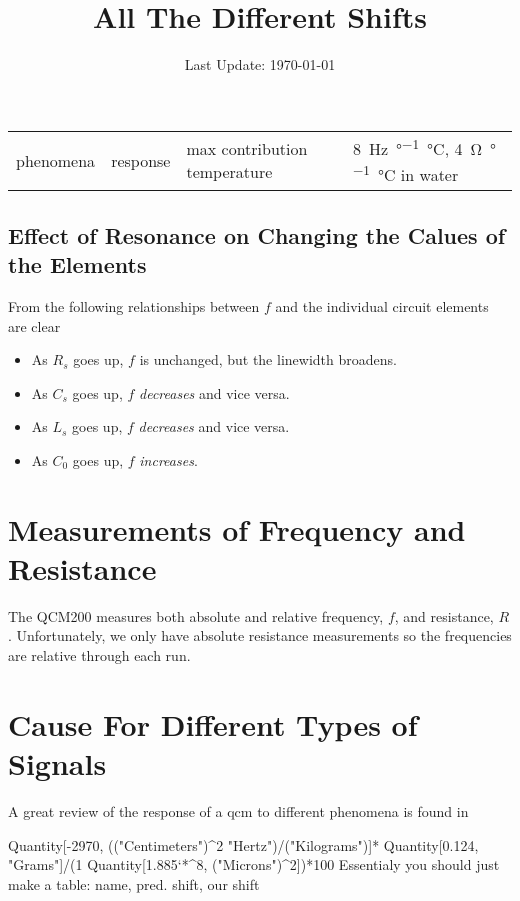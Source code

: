 \documentclass[a4paper]{article}
\begin{document}
\title{All The Different Shifts}
\date{Last Update: \today}
\maketitle
\tableofcontents

\begin{table}
 \begin{tabularx}{\textwidth}{ll}
  \toprule
  phenomena & response & max contribution
  \midrule
  temperature &
   \SI{8}{\hertz\per\degree\celsius}, \SI{4}{\ohm\per\degree\celsius} in water\cite{srsqcm}
  \bottomrule
 \end{tabularx}
\end{table}

\subsection{Effect of Resonance on Changing the Calues of the Elements}
From  the following relationships between $f$ and
the individual circuit elements are clear
\begin{itemize}
 \item As $R_s$ goes up, $f$ is unchanged, but the linewidth broadens.
 \item As $C_s$ goes up, $f$ \textit{decreases} and vice versa.
 \item As $L_s$ goes up, $f$ \textit{decreases} and vice versa.
 \item As $C_0$ goes up, $f$ \textit{increases}.
\end{itemize}

\section{Measurements of Frequency and Resistance}
The QCM200 measures both absolute and relative frequency, $f$, and
resistance, $R$.  Unfortunately, we only have absolute resistance
measurements so the frequencies are relative through each run.

\section{Cause For Different Types of Signals}
A great review of the response of a \gls{qcm} to different phenomena is found in \cite{walls1995fundamental}

Quantity[-2970, (("Centimeters")^2 "Hertz")/("Kilograms")]*
 Quantity[0.124, "Grams"]/(1 Quantity[1.885`*^8, ("Microns")^2])*100
Essentialy you should just make a table: name, pred. shift, our shift
\end{document}
